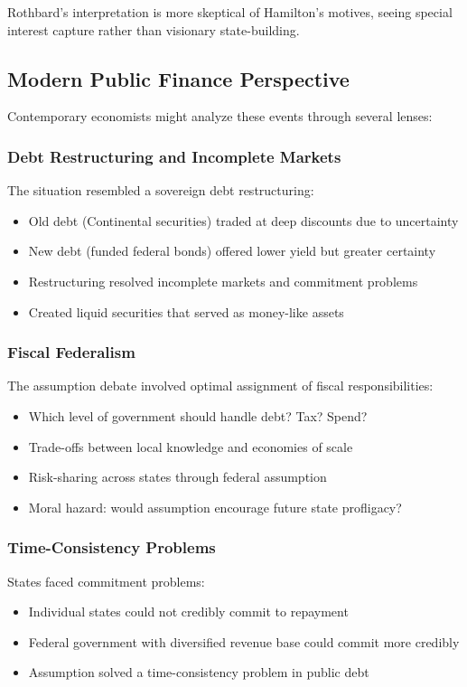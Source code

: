 \documentclass[12pt]{article}
\begin{document}
Rothbard's interpretation is more skeptical of Hamilton's motives, seeing special interest capture rather than visionary state-building.

\subsection{Modern Public Finance Perspective}

Contemporary economists might analyze these events through several lenses:

\subsubsection{Debt Restructuring and Incomplete Markets}

The situation resembled a sovereign debt restructuring:
\begin{itemize}
\item Old debt (Continental securities) traded at deep discounts due to uncertainty
\item New debt (funded federal bonds) offered lower yield but greater certainty
\item Restructuring resolved incomplete markets and commitment problems
\item Created liquid securities that served as money-like assets
\end{itemize}

\subsubsection{Fiscal Federalism}

The assumption debate involved optimal assignment of fiscal responsibilities:
\begin{itemize}
\item Which level of government should handle debt? Tax? Spend?
\item Trade-offs between local knowledge and economies of scale
\item Risk-sharing across states through federal assumption
\item Moral hazard: would assumption encourage future state profligacy?
\end{itemize}

\subsubsection{Time-Consistency Problems}

States faced commitment problems:
\begin{itemize}
\item Individual states could not credibly commit to repayment
\item Federal government with diversified revenue base could commit more credibly
\item Assumption solved a time-consistency problem in public debt
\end{itemize}
\end{document}
